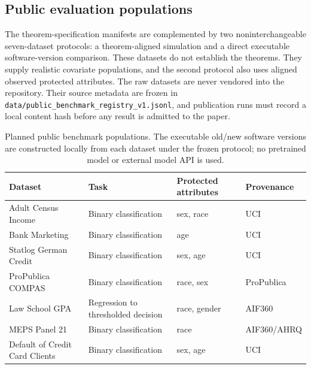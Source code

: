 \subsection{Public evaluation populations}

The theorem-specification manifests are complemented by two noninterchangeable
seven-dataset protocols: a theorem-aligned simulation and a direct executable
software-version comparison. These datasets do not establish the theorems.
They supply realistic covariate populations, and the second protocol also uses
aligned observed protected attributes. The raw datasets are never vendored
into the repository. Their source metadata are frozen in
\texttt{data/public\_benchmark\_registry\_v1.jsonl}, and publication runs must record a
local content hash before any result is admitted to the paper.

\begin{table}[H]
\centering
\caption{Planned public benchmark populations. The executable old/new software
versions are constructed locally from each dataset under the frozen protocol;
no pretrained model or external model API is used.}
\label{arch:tab:public-datasets}
\normalsize
\begin{tabular}{@{}p{}p{}p{}p{}@{}}
\toprule
Dataset & Task & Protected attributes & Provenance \\
\midrule
Adult Census Income & Binary classification & sex, race & UCI \cite{AdultDatasetUCI} \\
Bank Marketing & Binary classification & age & UCI \cite{BankMarketingUCI} \\
Statlog German Credit & Binary classification & sex, age & UCI \cite{GermanCreditUCI} \\
ProPublica COMPAS & Binary classification & race, sex & ProPublica \cite{ProPublicaCOMPAS2016} \\
Law School GPA & Regression to thresholded decision & race, gender & AIF360 \cite{BellamyEtAl2019} \\
MEPS Panel 21 & Binary classification & race & AIF360/AHRQ \cite{BellamyEtAl2019} \\
Default of Credit Card Clients & Binary classification & sex, age & UCI \cite{DefaultCreditUCI} \\
\bottomrule
\end{tabular}
\end{table}

